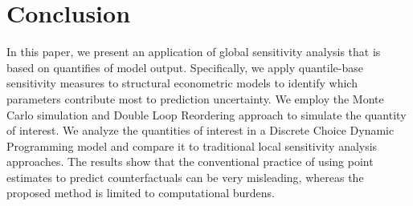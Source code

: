 
\section{Conclusion} \label{sec:6}
\thispagestyle{plain} %


In this paper, we present an application of global sensitivity analysis that is based on quantifies of model output. Specifically, we apply quantile-base sensitivity measures to structural econometric models to identify which parameters contribute most to prediction uncertainty. We employ the Monte Carlo simulation and Double Loop Reordering approach to simulate the quantity of interest.  We analyze the quantities of interest in a Discrete Choice Dynamic Programming model and compare it to traditional local sensitivity analysis approaches. The results show that the conventional practice of using point estimates to predict counterfactuals can be very misleading, whereas the proposed method is limited to computational burdens.
